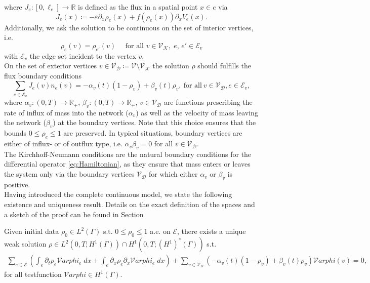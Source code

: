 where $J_e \colon [0, \ell_e] \to \mathbb{R}$ is defined as the flux in a spatial point $x \in e$ via 
\begin{equation} 
    \label{eq:flux} 
    J_e(x) \coloneqq - \varepsilon \partial_x \rho_e (x) + f(\rho_e(x)) \partial_x V_e(x).
\end{equation}
Additionally, we ask the solution to be continuous on the set of interior vertices, i.e. 
\begin{equation}
    \rho_e(v) = \rho_{e'}(v) \quad \text{ for all }v \in \mathcal{V}_\mathcal{K},\; e,\,e' \in \mathcal{E}_v
\end{equation}
with $\mathcal{E}_v$ the edge set incident to the vertex $v$. \\
On the set of exterior vertices $v \in \mathcal{V}_\mathcal{D} \coloneqq \mathcal{V} \setminus \mathcal{V}_\mathcal{K}$ the solution $\rho$ should fulfills the flux boundary conditions
\begin{equation}
    \label{eq:Dirichlet_conditions}
    \sum_{e\in \mathcal{E}_v}J_e(v) n_e (v)=-\alpha_v(t) (1-\rho_v) + \beta_v(t) \rho_v,\ \text{for all}\ v \in \mathcal{V}_\mathcal{D}, e \in \mathcal{E}_v,
\end{equation}
where $\alpha_v \colon (0,T) \to \mathbb{R}_{+}, \, \beta_v \colon (0,T) \to \mathbb{R}_{+}$, ${v \in \mathcal{V}_\mathcal{D}}$ are functions prescribing the rate of influx of mass into the network ($\alpha_v$) as well as the velocity of mass leaving the network ($\beta_v$) at the boundary vertices. Note that this choice ensures that the bounds $0 \le \rho_e \le 1$ are preserved. In typical situations, boundary vertices are either of influx- or of outflux type, i.e. $\alpha_v \beta_v = 0$ for all $v \in \mathcal{V}_\mathcal{D}$. \\
The Kirchhoff-Neumann conditions are the natural boundary conditions for the differential operator \eqref{eq:Hamiltonian}, as they ensure that mass enters or leaves the system only via the boundary vertices $\mathcal{V}_\mathcal{D}$ for which either $\alpha_v$ or $\beta_v$ is positive. \\
Having introduced the complete continuous model, we state the following existence and uniqueness result. Details on the exact definition of the spaces and a sketch of the proof can be found in Section 

\begin{theorem} 
    Given initial data $\rho_0 \in L^2(\Gamma)$ s.t. $0 \le \rho_0 \le 1$ a.e. on $\mathcal{E}$, there exists a unique weak solution $\rho \in L^2(0,T; H^1(\Gamma)) \cap H^1(0,T; (H^1)^*(\Gamma))$ s.t.
	\begin{align*}
		\sum_{e \in \mathcal{E}} \left(\int_e  \partial_t \rho_e \mathcal{V}arphi_e \;dx + \int_e \partial_x \rho_e\partial_x \mathcal{V}arphi_e \;dx\right) + \sum_{v \in \mathcal{V}_D} (-\alpha_v(t) (1-\rho_v) + \beta_v(t) \rho_v)\mathcal{V}arphi(v) = 0,
	\end{align*}
	for all testfunction $\mathcal{V}arphi \in H^1(\Gamma)$.
\end{theorem}

